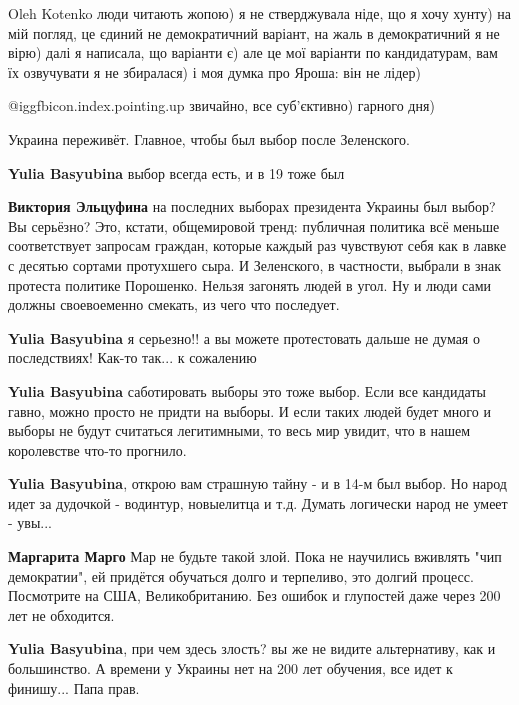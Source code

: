 \begin{itemize}
\begin{itemize}

Oleh Kotenko люди читають жопою) я не стверджувала ніде, що я хочу хунту) на мій погляд, це єдиний не демократичний варіант, на жаль в демократичний я не вірю) далі я написала, що варіанти є) але це мої варіанти по кандидатурам, вам їх озвучувати я не збиралася) і моя думка про Яроша: він не лідер)

@igg{fbicon.index.pointing.up} звичайно, все суб'єктивно) гарного дня)

\end{itemize} %

Украина переживёт. Главное, чтобы был выбор после Зеленского.

\begin{itemize} %
\textbf{Yulia Basyubina} выбор всегда есть, и в 19 тоже был

\textbf{Виктория Эльцуфина} на последних выборах президента Украины был выбор? Вы серьёзно?
Это, кстати, общемировой тренд: публичная политика всё меньше соответствует запросам граждан, которые каждый раз чувствуют себя как в лавке с десятью сортами протухшего сыра. И Зеленского, в частности, выбрали в знак протеста политике Порошенко. Нельзя загонять людей в угол. Ну и люди сами должны своевоеменно смекать, из чего что последует.

\textbf{Yulia Basyubina} я серьезно!! а вы можете протестовать дальше не думая о последствиях! Как-то так... к сожалению

\textbf{Yulia Basyubina} саботировать выборы это тоже выбор. Если все кандидаты гавно, можно просто не придти на выборы. И если таких людей будет много и выборы не будут считаться легитимными, то весь мир увидит, что в нашем королевстве что-то прогнило.

\textbf{Yulia Basyubina}, открою вам страшную тайну - и в 14-м был выбор. Но народ идет за дудочкой - водинтур, новыелитца и т.д. Думать логически народ не умеет - увы...

\textbf{Маргарита Марго} Мар не будьте такой злой. Пока не научились вживлять "чип демократии", ей придётся обучаться долго и терпеливо, это долгий процесс. Посмотрите на США, Великобританию. Без ошибок и глупостей даже через 200 лет не обходится.

\textbf{Yulia Basyubina}, при чем здесь злость? вы же не видите альтернативу, как и большинство. А времени у Украины нет на 200 лет обучения, все идет к финишу... Папа прав.


\end{itemize}
\end{itemize}
